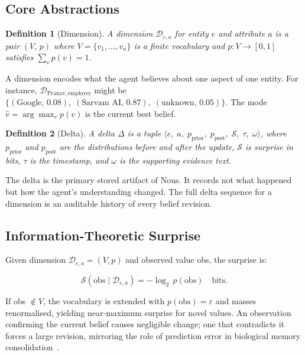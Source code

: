 \documentclass[11pt,a4paper,twocolumn]{article}
\newtheorem{definition}{Definition}
\begin{document}
\subsection{Core Abstractions}

\begin{definition}[Dimension]
A dimension $\mathcal{D}_{e,a}$ for entity $e$ and attribute $a$ is a pair
$(V,\, p)$ where $V = \{v_1, \ldots, v_n\}$ is a finite vocabulary and
$p : V \to [0,1]$ satisfies $\sum_{v} p(v) = 1$.
\end{definition}

\medskip

A dimension encodes what the agent believes about one aspect of one entity.
For instance, $\mathcal{D}_{\text{Pranav},\,\text{employer}}$ might be
$\{(\text{Google},\, 0.08),\; (\text{Sarvam AI},\, 0.87),\;
(\text{unknown},\, 0.05)\}$. The mode $\hat{v} = \arg\max_v p(v)$ is the
current best belief.

\begin{definition}[Delta]
A delta $\Delta$ is a tuple
$\langle e,\; a,\; p_{\mathrm{prior}},\; p_{\mathrm{post}},\;
\mathcal{S},\; \tau,\; \omega \rangle$,
where $p_{\mathrm{prior}}$ and $p_{\mathrm{post}}$ are the distributions
before and after the update, $\mathcal{S}$ is surprise in bits, $\tau$ is
the timestamp, and $\omega$ is the supporting evidence text.
\end{definition}

\medskip

The delta is the primary stored artifact of Nous. It records not what happened
but how the agent's understanding changed. The full delta sequence for a
dimension is an auditable history of every belief revision.

\subsection{Information-Theoretic Surprise}

Given dimension $\mathcal{D}_{e,a} = (V, p)$ and observed value obs, the
surprise is:

\begin{equation}
  \mathcal{S}(\text{obs} \mid \mathcal{D}_{e,a})
    = -\log_2\, p(\text{obs})
  \quad \text{bits.}
  \label{eq:surprise}
\end{equation}

If obs $\notin V$, the vocabulary is extended with $p(\text{obs}) = \varepsilon$
and masses renormalised, yielding near-maximum surprise for novel values. An
observation confirming the current belief causes negligible change; one that
contradicts it forces a large revision, mirroring the role of prediction error
in biological memory consolidation~\citep{friston2010fep}.
\end{document}
